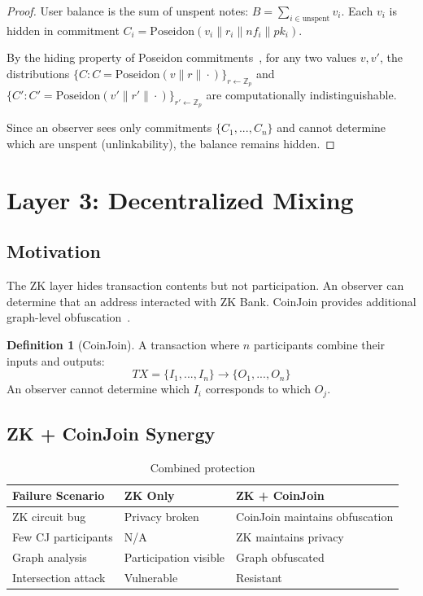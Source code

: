 \documentclass[11pt]{article}
\theoremstyle{definition}
\newtheorem{definition}{Definition}[section]
\theoremstyle{plain}
\theoremstyle{remark}
\begin{document}
\begin{proof}
User balance is the sum of unspent notes: $B = \sum_{i \in \text{unspent}} v_i$. Each $v_i$ is hidden in commitment $C_i = \text{Poseidon}(v_i \| r_i \| nf_i \| pk_i)$.

By the hiding property of Poseidon commitments~\cite{grassi2021poseidon}, for any two values $v, v'$, the distributions $\{C : C = \text{Poseidon}(v \| r \| \cdot)\}_{r \gets \mathbb{Z}_p}$ and $\{C' : C' = \text{Poseidon}(v' \| r' \| \cdot)\}_{r' \gets \mathbb{Z}_p}$ are computationally indistinguishable.

Since an observer sees only commitments $\{C_1, ..., C_n\}$ and cannot determine which are unspent (unlinkability), the balance remains hidden.
\end{proof}

\section{Layer 3: Decentralized Mixing}
\label{sec:layer3}

\subsection{Motivation}

The ZK layer hides transaction contents but not participation. An observer can determine that an address interacted with ZK Bank. CoinJoin provides additional graph-level obfuscation~\cite{maxwell2013coinjoin}.

\begin{definition}[CoinJoin]
A transaction where $n$ participants combine their inputs and outputs:
\begin{equation}
TX = \{I_1, ..., I_n\} \rightarrow \{O_1, ..., O_n\}
\end{equation}
An observer cannot determine which $I_i$ corresponds to which $O_j$.
\end{definition}

\subsection{ZK + CoinJoin Synergy}

\begin{table}[H]
\centering
\caption{Combined protection}
\label{tab:synergy}
\begin{tabular}{lll}
\toprule
\textbf{Failure Scenario} & \textbf{ZK Only} & \textbf{ZK + CoinJoin} \\
\midrule
ZK circuit bug & Privacy broken & CoinJoin maintains obfuscation \\
Few CJ participants & N/A & ZK maintains privacy \\
Graph analysis & Participation visible & Graph obfuscated \\
Intersection attack & Vulnerable & Resistant \\
\bottomrule
\end{tabular}
\end{table}
\end{document}
